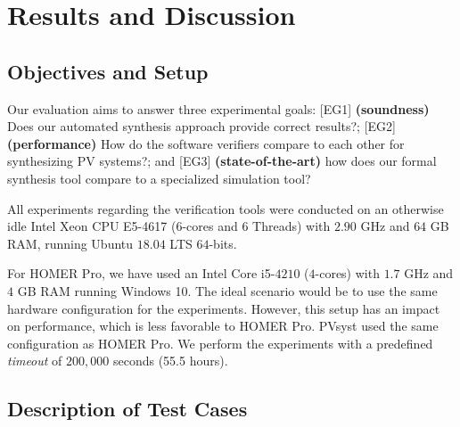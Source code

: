 \documentclass[10pt,journal,compsoc]{IEEEtran}
\begin{document}
\section{Results and Discussion}

\subsection{Objectives and Setup}
\label{ObjectivesAndSetup}

Our evaluation aims to answer three experimental goals: [EG1] \textbf{(soundness)} Does our automated synthesis approach provide correct results?; [EG2] \textbf{(performance)} How do the software verifiers compare to each other for synthesizing PV systems?; and [EG3] \textbf{(state-of-the-art)} how does our formal synthesis tool compare to a specialized simulation tool?

  All experiments regarding the verification tools were conducted on an otherwise idle Intel Xeon CPU E5-4617 ($6$-cores and 6 Threads) with $2.90$ GHz and $64$ GB RAM, running Ubuntu $18.04$ LTS $64$-bits. 

For HOMER Pro, we have used an Intel Core i5-$4210$ ($4$-cores) with $1.7$ GHz and $4$ GB RAM running Windows 10. The ideal scenario would be to use the same hardware configuration for the experiments. However, this setup has an impact on performance, which is less favorable to HOMER Pro. PVsyst used the same configuration as HOMER Pro. We perform the experiments with a predefined \textit{timeout} of $200,000$ seconds (55.5 hours).\color{black}

\subsection{Description of Test Cases}
\end{document}
